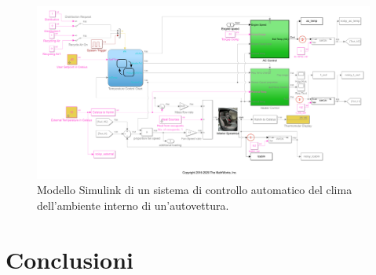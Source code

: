 \documentclass[Lau,binding=0.6cm]{sapthesis}
\begin{document}
\begin{figure}
    \includegraphics[scale=0.45]{climate.png}
    \centering
    \caption{Modello Simulink di un sistema di controllo automatico del clima dell'ambiente interno di un'autovettura.}
    \label{fig:2}
\end{figure}

\chapter{Conclusioni}

\backmatter
\end{document}
